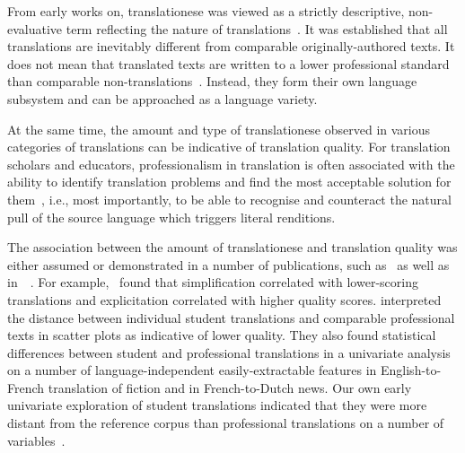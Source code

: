 From early works on, translationese was viewed as a strictly descriptive, non-evaluative term reflecting the nature of translations~\cite{Gellerstam1986, Baker1993}. It was established that all translations are inevitably different from comparable originally-authored texts. It does not mean that translated texts are written to a lower professional standard than comparable non-translations~\cite{Sutter2017}. Instead, they form their own language subsystem and can be approached as a language variety.

At the same time, the amount and type of translationese observed in various categories of translations can be indicative of translation quality. For translation scholars and educators, professionalism in translation is often associated with the ability to identify translation problems and find the most acceptable solution for them~\cite{Pym2003}, i.e., most importantly, to be able to recognise and counteract the natural pull of the source language which triggers literal renditions.

The association between the amount of translationese and translation quality was either assumed or demonstrated in a number of publications, such as~\citet{Scarpa2006, Rabadan2009, Sutter2017} as well as in~\citet{Loock2013, Loock2016}~\cite[as quoted by][]{Sutter2017}. For example,~\citet{Scarpa2006} found that simplification correlated with lower-scoring translations and explicitation correlated with higher quality scores. \citet{Sutter2017} interpreted the distance between individual student translations and comparable professional texts in scatter plots as indicative of lower quality. They also found statistical differences between student and professional translations in a univariate analysis on a number of language-independent easily-extractable features in English-to-French translation of fiction and in French-to-Dutch news. Our own early univariate exploration of student translations indicated that they were more distant from the reference corpus than professional translations on a number of variables~\cite{Kunilovskaya2018profiles}.

